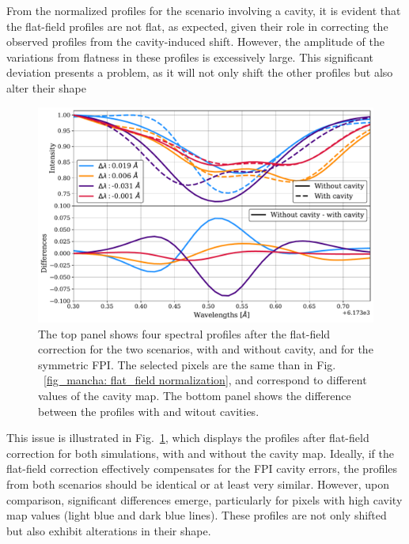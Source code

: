 From the normalized profiles for the scenario involving a cavity, it is evident that the flat-field profiles are not flat, as expected, given their role in correcting the observed profiles from the cavity-induced shift. However, the amplitude of the variations from flatness in these profiles is excessively large. This significant deviation presents a problem, as it will not only shift the other profiles but also alter their shape

\begin{figure}
  \begin{minipage}[c]{0.7\textwidth}
    \includegraphics[width=\textwidth]{figures/Mancha/flatfield_norm_differences.pdf}
  \end{minipage}\hfill\hfill
  \begin{minipage}[c]{0.27\textwidth}
    \caption{
          The top panel shows four spectral profiles after the flat-field correction for the two scenarios, with and without cavity, and for the symmetric FPI. The selected pixels are the same than in Fig. ~\ref{fig_mancha: flat_field normalization}, and correspond to different values of the cavity map. The bottom panel shows the difference between the profiles with and witout cavities.
    \label{fig_mancha: Profiles_differences}} 
  \end{minipage}
\end{figure}

This issue is illustrated in Fig.~\ref{fig_mancha: Profiles_differences}, which displays the profiles after flat-field correction for both simulations, with and without the cavity map. Ideally, if the flat-field correction effectively compensates for the FPI cavity errors, the profiles from both scenarios should be identical or at least very similar. However, upon comparison, significant differences emerge, particularly for pixels with high cavity map values (light blue and dark blue lines). These profiles are not only shifted but also exhibit alterations in their shape. 


